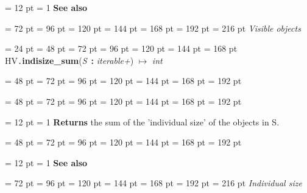 {{{{{{\par \pagebreak[3.100000] \noindent \hangindent = 12 pt \hangafter = 1 
{\bf See also\/}\par}
{\par \noindent  \leftskip = 72 pt  \leftmargini = 96 pt  \leftmarginii = 120 pt  \leftmarginiii = 144 pt  \leftmarginiv = 168 pt  \leftmarginv = 192 pt  \leftmarginvi = 216 pt   {\em  Visible objects
\/}\par}
\par}
\par}
\par}
\par}
{\par \noindent  \leftskip = 24 pt  \leftmargini = 48 pt  \leftmarginii = 72 pt  \leftmarginiii = 96 pt  \leftmarginiv = 120 pt  \leftmarginv = 144 pt  \leftmarginvi = 168 pt HV{\tt .\/}{\bf {\large {\bf indisize{\_}sum\/}}\/}({\em S\/}~{\bf :}  {\em iterable+\/}) \(\mapsto \)  {\em int\/}{\par \noindent
{\par \noindent  \leftskip = 48 pt  \leftmargini = 72 pt  \leftmarginii = 96 pt  \leftmarginiii = 120 pt  \leftmarginiv = 144 pt  \leftmarginv = 168 pt  \leftmarginvi = 192 pt {\par \noindent
\par}
\par}
{\par \noindent  \leftskip = 48 pt  \leftmargini = 72 pt  \leftmarginii = 96 pt  \leftmarginiii = 120 pt  \leftmarginiv = 144 pt  \leftmarginv = 168 pt  \leftmarginvi = 192 pt {\par \noindent
{\par \pagebreak[3.100000] \noindent \hangindent = 12 pt \hangafter = 1 
{\bf Returns \/} the sum of the 'individual size' of the objects in S.\par}
\par}
\par}
{\par \noindent  \leftskip = 48 pt  \leftmargini = 72 pt  \leftmarginii = 96 pt  \leftmarginiii = 120 pt  \leftmarginiv = 144 pt  \leftmarginv = 168 pt  \leftmarginvi = 192 pt {\par \noindent
{\par \pagebreak[3.100000] \noindent \hangindent = 12 pt \hangafter = 1 
{\bf See also\/}\par}
{\par \noindent  \leftskip = 72 pt  \leftmargini = 96 pt  \leftmarginii = 120 pt  \leftmarginiii = 144 pt  \leftmarginiv = 168 pt  \leftmarginv = 192 pt  \leftmarginvi = 216 pt   {\em  Individual size
}}}}}}}
